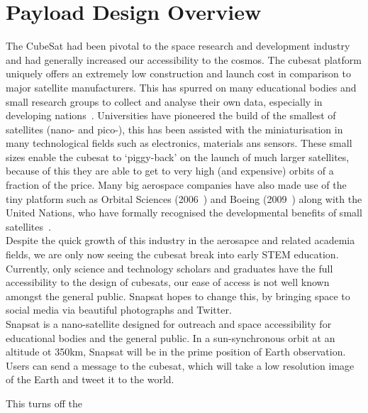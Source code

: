 \section{Payload Design Overview}
The CubeSat had been pivotal to the space research and development industry and had generally increased our accessibility to the cosmos. The cubesat platform uniquely offers an extremely low construction and launch cost in comparison to major satellite manufacturers. This has spurred on many educational bodies and small research groups to collect and analyse their own data, especially in developing nations~\cite{woeller}. Universities have pioneered the build of the smallest of satellites (nano- and pico-), this has been assisted with the miniaturisation in many technological fields such as electronics, materials ans sensors. These small sizes enable the cubesat to `piggy-back' on the launch of much larger satellites, because of this they are able to get to very high (and expensive) orbits of a fraction of the price. Many big aerospace companies have also made use of the tiny platform such as Orbital Sciences (2006~\cite{orbital}) and Boeing (2009~\cite{beoing}) along with the United Nations, who have formally recognised the developmental benefits of small satellites~\cite{rycroft}. \\

\noindent
Despite the quick growth of this industry in the aerosapce and related academia fields, we are only now seeing the cubesat break into early STEM education. Currently, only science and technology scholars and graduates have the full accessibility to the design of cubesats, our ease of access is not well known amongst the general public. Snapsat hopes to change this, by bringing space to social media via beautiful photographs and Twitter. \\

\noindent
Snapsat is a nano-satellite designed for outreach and space accessibility for educational bodies and the general public. In a sun-synchronous orbit at an altitude ot 350km, Snapsat will be in the prime position of Earth observation. Users can send a message to the cubesat, which will take a low resolution image of the Earth and tweet it to the world.

This turns off the 